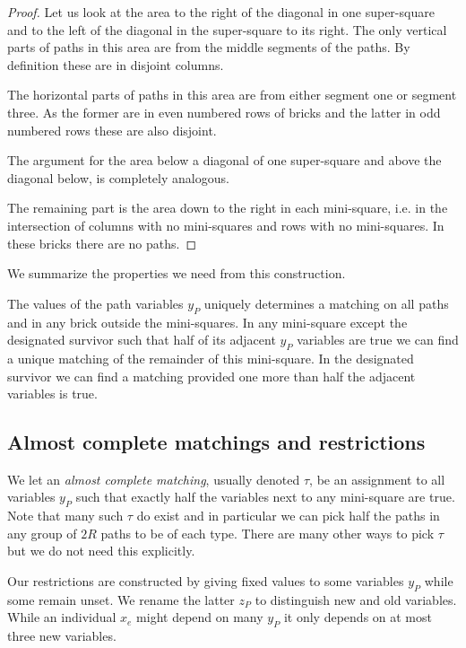 \documentclass{theoretics}
\begin{document}
\begin{proof}
Let us look at the area to the right of the diagonal in one
super-square and to the left of the diagonal in the super-square
to its right.  The only vertical parts of paths in this area
are from the middle segments of the paths.  By definition
these are in disjoint columns.

The horizontal parts of paths in this area  are from either segment one
or segment three.  As the former are in even numbered rows
of bricks and the latter in odd numbered rows these
are also disjoint.

The argument for the area below a diagonal of one super-square and above
the diagonal below, is completely analogous.

The remaining part is the area down to the right in each mini-square, i.e.
in the intersection of columns with no mini-squares and 
rows with no mini-squares.
In these bricks there are no paths.
\end{proof}

We summarize the properties we need from
this construction.  

\begin{lemma}\label{lemma:newmatching}
The values of the path variables $y_P$ uniquely determines
a matching on all paths and in any brick outside
the mini-squares.  In any mini-square except
the designated survivor such that half of its adjacent
$y_P$ variables are true we can find a unique matching
of the remainder of this mini-square.
In the designated survivor we can find a matching
provided one more than half the adjacent
variables is true.
\end{lemma}

\subsection{Almost complete matchings and restrictions}

We let an {\em almost complete matching}, usually denoted $\tau$,
be an assignment to all variables $y_P$ such that exactly half the
variables next to any mini-square are true.  Note that many such
$\tau$ do exist and in particular we can pick half the paths
in any group of $2R$ paths to be of each type.
There are many other ways to pick $\tau$ but we
do not need this explicitly.

Our restrictions are constructed by giving
fixed values to some variables $y_P$ while
some remain unset.  We rename the latter $z_P$ to distinguish
new and old variables.  While an individual $x_e$ might depend on
many $y_P$ it only depends on at most three new variables.
\end{document}
